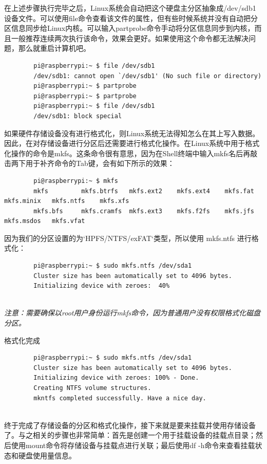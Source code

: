 \documentclass[UTF8]{article}
\begin{document}
	
	在上述步骤执行完毕之后，Linux系统会自动把这个硬盘主分区抽象成/dev/sdb1设备文件。可以使用file命令查看该文件的属性，但有些时候系统并没有自动把分区信息同步给Linux内核。可以输入partprobe命令手动将分区信息同步到内核，而且一般推荐连续两次执行该命令，效果会更好。如果使用这个命令都无法解决问题，那么就重启计算机吧。
	
	\begin{lstlisting}
		pi@raspberrypi:~ $ file /dev/sdb1
		/dev/sdb1: cannot open `/dev/sdb1' (No such file or directory)
		pi@raspberrypi:~ $ partprobe
		pi@raspberrypi:~ $ partprobe
		pi@raspberrypi:~ $ file /dev/sdb1
		/dev/sdb1: block special
	\end{lstlisting}
	
	如果硬件存储设备没有进行格式化，则Linux系统无法得知怎么在其上写入数据。因此，在对存储设备进行分区后还需要进行格式化操作。在Linux系统中用于格式化操作的命令是mkfs。这条命令很有意思，因为在Shell终端中输入mkfs名后再敲击两下用于补齐命令的Tab键，会有如下所示的效果：
	
	\begin{lstlisting}
		pi@raspberrypi:~ $ mkfs
		mkfs         mkfs.btrfs   mkfs.ext2    mkfs.ext4    mkfs.fat     mkfs.minix   mkfs.ntfs    mkfs.xfs
		mkfs.bfs     mkfs.cramfs  mkfs.ext3    mkfs.f2fs    mkfs.jfs     mkfs.msdos   mkfs.vfat
	\end{lstlisting}
	
	因为我们的分区设置的为`HPFS/NTFS/exFAT`类型，所以使用 mkfs.ntfs 进行格式化：
	
	\begin{lstlisting}
		pi@raspberrypi:~ $ sudo mkfs.ntfs /dev/sda1
		Cluster size has been automatically set to 4096 bytes.
		Initializing device with zeroes:  40%
		
	\end{lstlisting}
	
	\emph{注意：需要确保以root用户身份运行mkfs命令，因为普通用户没有权限格式化磁盘分区。}
	
	格式化完成
	
	\begin{lstlisting}
		pi@raspberrypi:~ $ sudo mkfs.ntfs /dev/sda1
		Cluster size has been automatically set to 4096 bytes.
		Initializing device with zeroes: 100% - Done.
		Creating NTFS volume structures.
		mkntfs completed successfully. Have a nice day.
		
	\end{lstlisting}
	
	终于完成了存储设备的分区和格式化操作，接下来就是要来挂载并使用存储设备了。与之相关的步骤也非常简单：首先是创建一个用于挂载设备的挂载点目录；然后使用mount命令将存储设备与挂载点进行关联；最后使用df -h命令来查看挂载状态和硬盘使用量信息。
	
\end{document}
